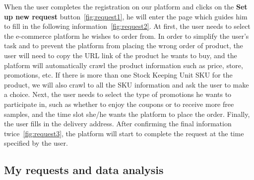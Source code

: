 When the user completes the registration on our platform and clicks on the \textbf{Set up new request} button~\ref{fig:request1}, he will enter the page which guides him to fill in the following information~\ref{fig:request2}. At first, the user needs to select the e-commerce platform he wishes to order from. In order to simplify the user's task and to prevent the platform from placing the wrong order of product, the user will need to copy the URL link of the product he wants to buy, and the platform will automatically crawl the product information such as price, store, promotions, etc. If there is more than one Stock Keeping Unit SKU for the product, we will also crawl to all the SKU information and ask the user to make a choice. Next, the user needs to select the type of promotions he wants to participate in, such as whether to enjoy the coupons or to receive more free samples, and the time slot she/he wants the platform to place the order. Finally, the user fills in the delivery address. After confirming the final information twice~\ref{fig:request3}, the platform will start to complete the request at the time specified by the user.

\subsection{My requests and data analysis}


